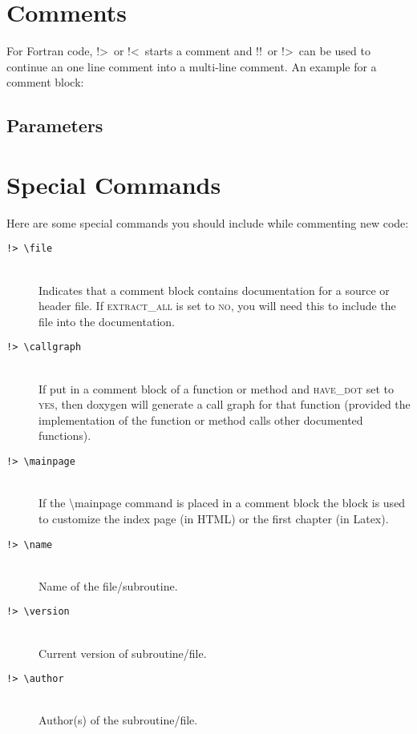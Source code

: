 \documentclass[a4paper,11pt,headsepline]{scrartcl}
\begin{document}
\section{Comments}
For Fortran code, \grqq !>\grqq \ or \grqq !<\grqq \ starts a comment and \grqq !!\grqq \ or \grqq !>\grqq \ can be used to continue an one line comment into a multi-line comment. An example for a comment block:

\subsection*{Parameters}

\section{Special Commands} \label{image}
Here are some special commands you should include while commenting new code:
\begin{description}
\item[\texttt{!> \textbackslash file}]\hfill \\
Indicates that a comment block contains documentation for a source or header file. If \textsc{extract\_all} is set to \textsc{no}, you will need this to include the file into the documentation.
\item[\texttt{!> \textbackslash callgraph}]\hfill \\ 
If put in a comment block of a function or method and \textsc{have\_dot} set to \textsc{yes}, then doxygen will generate a call graph for that function (provided the implementation of the function or method calls other documented functions).
\item[\texttt{!> \textbackslash mainpage}]\hfill \\ 
If the \textbackslash mainpage command is placed in a comment block the block is used to customize the index page (in HTML) or the first chapter (in Latex).
\item[\texttt{!> \textbackslash name}]\hfill \\ 
Name of the file/subroutine.
\item[\texttt{!> \textbackslash version}]\hfill \\
Current version of subroutine/file.
\item[\texttt{!> \textbackslash author}]\hfill \\ 
Author(s) of the subroutine/file.
\end{description}
\end{document}
